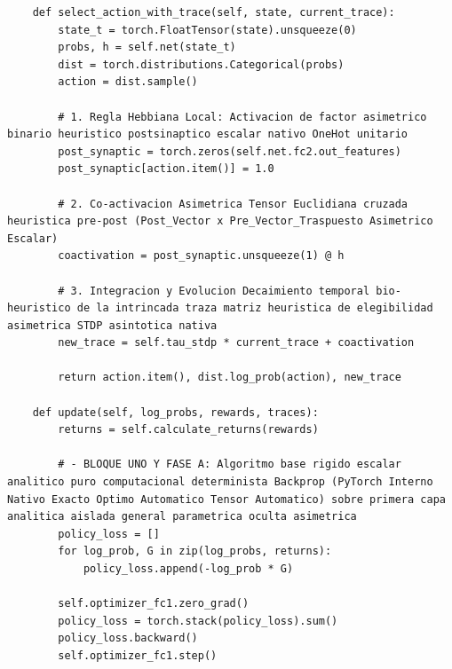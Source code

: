 \documentclass[a4paper,12pt,twocolumn]{article}
\begin{document}
\begin{lstlisting}
    def select_action_with_trace(self, state, current_trace):
        state_t = torch.FloatTensor(state).unsqueeze(0)
        probs, h = self.net(state_t)
        dist = torch.distributions.Categorical(probs)
        action = dist.sample()
        
        # 1. Regla Hebbiana Local: Activacion de factor asimetrico binario heuristico postsinaptico escalar nativo OneHot unitario
        post_synaptic = torch.zeros(self.net.fc2.out_features)
        post_synaptic[action.item()] = 1.0
        
        # 2. Co-activacion Asimetrica Tensor Euclidiana cruzada heuristica pre-post (Post_Vector x Pre_Vector_Traspuesto Asimetrico Escalar)
        coactivation = post_synaptic.unsqueeze(1) @ h
        
        # 3. Integracion y Evolucion Decaimiento temporal bio-heuristico de la intrincada traza matriz heuristica de elegibilidad asimetrica STDP asintotica nativa
        new_trace = self.tau_stdp * current_trace + coactivation
        
        return action.item(), dist.log_prob(action), new_trace
        
    def update(self, log_probs, rewards, traces):
        returns = self.calculate_returns(rewards)
        
        # - BLOQUE UNO Y FASE A: Algoritmo base rigido escalar analitico puro computacional determinista Backprop (PyTorch Interno Nativo Exacto Optimo Automatico Tensor Automatico) sobre primera capa analitica aislada general parametrica oculta asimetrica
        policy_loss = []
        for log_prob, G in zip(log_probs, returns):
            policy_loss.append(-log_prob * G)
            
        self.optimizer_fc1.zero_grad()
        policy_loss = torch.stack(policy_loss).sum()
        policy_loss.backward()
        self.optimizer_fc1.step()
        

\end{lstlisting}
\end{document}
